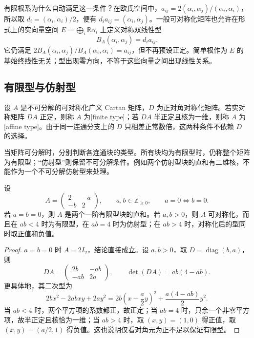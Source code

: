 \ProseParagraphBreak

有限根系为什么自动满足这一条件？在欧氏空间中，\(a_{ij}=2(\alpha_i,\alpha_j)/(\alpha_i,\alpha_i)\)，所以取 \(d_i=(\alpha_i,\alpha_i)/2\)，便有 \(d_i a_{ij}=(\alpha_i,\alpha_j)\)。一般可对称化矩阵也允许在形式上的实向量空间 \(E=\bigoplus_i\mathbb R\alpha_i\) 上定义对称双线性型
\[
	B_A(\alpha_i,\alpha_j)=d_i a_{ij}.
\]
它仍满足 \(2B_A(\alpha_i,\alpha_j)/B_A(\alpha_i,\alpha_i)=a_{ij}\)，但不再预设正定。简单根作为 \(E\) 的基始终线性无关；型出现零方向，不等于这些向量之间出现线性关系。

\subsection{有限型与仿射型}
\label{b5:subsec:G01:02}

\begin{definition}\label{b5:def:G-matrix-types}
	设 \(A\) 是不可分解的可对称化广义 Cartan 矩阵，\(D\) 为正对角对称化矩阵。若实对称矩阵 \(DA\) 正定，则称 \(A\) 为[finite type]；若 \(DA\) 半正定且核为一维，则称 \(A\) 为[affine type]。由于同一连通分支上的 \(D\) 只相差正常数倍，这两种条件不依赖 \(D\) 的选择。
\end{definition}

当矩阵可分解时，分别判断各连通块的类型。所有块均为有限型时，仍称整个矩阵为有限型；“仿射型”则保留不可分解条件。例如两个仿射型块的直和有二维核，不能作为一个不可分解仿射型来处理。

\begin{proposition}\label{b5:prop:G-rank-two-types}
	设
	\[
		A=\begin{pmatrix}2&-a\\-b&2\end{pmatrix},\qquad a,b\in\mathbb Z_{\ge0},\qquad a=0\Longleftrightarrow b=0.
	\]
	若 \(a=b=0\)，则 \(A\) 是两个一阶有限型块的直和。若 \(a,b>0\)，则 \(A\) 可对称化，而且在 \(ab<4\) 时为有限型，在 \(ab=4\) 时为仿射型；在 \(ab>4\) 时，对称化后的型同时取正值和负值。
\end{proposition}
\begin{proof}
	\(a=b=0\) 时 \(A=2I_2\)，结论直接成立。设 \(a,b>0\)，取 \(D=\operatorname{diag}(b,a)\)，则
	\[
		DA=\begin{pmatrix}2b&-ab\\-ab&2a\end{pmatrix},\qquad
		\det(DA)=ab(4-ab).
	\]
	更具体地，其二次型为
	\[
		2b x^2-2abxy+2ay^2
		=2b\left(x-\frac a2y\right)^2+\frac{a(4-ab)}2y^2.
	\]
	当 \(ab<4\) 时，两个平方项的系数都正，故正定；当 \(ab=4\) 时，只余一个非零平方项，故半正定且核恰为一维；当 \(ab>4\) 时，取 \((x,y)=(1,0)\) 得正值，取 \((x,y)=(a/2,1)\) 得负值。这也说明仅看对角元为正不足以保证有限型。
\end{proof}

